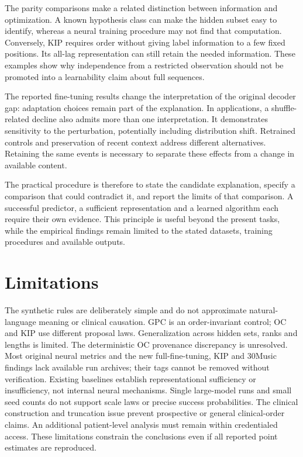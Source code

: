 \documentclass[10pt]{article}
\begin{document}
The parity comparisons make a related distinction between information and optimization. A known hypothesis class can make the hidden subset easy to identify, whereas a neural training procedure may not find that computation. Conversely, KIP requires order without giving label information to a few fixed positions. Its all-lag representation can still retain the needed information. These examples show why independence from a restricted observation should not be promoted into a learnability claim about full sequences.

The reported fine-tuning results change the interpretation of the original decoder gap: adaptation choices remain part of the explanation. In applications, a shuffle-related decline also admits more than one interpretation. It demonstrates sensitivity to the perturbation, potentially including distribution shift. Retrained controls and preservation of recent context address different alternatives. Retaining the same events is necessary to separate these effects from a change in available content.

The practical procedure is therefore to state the candidate explanation, specify a comparison that could contradict it, and report the limits of that comparison. A successful predictor, a sufficient representation and a learned algorithm each require their own evidence. This principle is useful beyond the present tasks, while the empirical findings remain limited to the stated datasets, training procedures and available outputs.

\section{Limitations}
\label{sec:limitations}
The synthetic rules are deliberately simple and do not approximate natural-language meaning or clinical causation. GPC is an order-invariant control; OC and KIP use different proposal laws. Generalization across hidden sets, ranks and lengths is limited. The deterministic OC provenance discrepancy is unresolved. Most original neural metrics and the new full-fine-tuning, KIP and 30Music findings lack available run archives; their tags cannot be removed without verification. Existing baselines establish representational sufficiency or insufficiency, not internal neural mechanisms. Single large-model runs and small seed counts do not support scale laws or precise success probabilities. The clinical construction and truncation issue prevent prospective or general clinical-order claims. An additional patient-level analysis must remain within credentialed access. These limitations constrain the conclusions even if all reported point estimates are reproduced.
\end{document}
